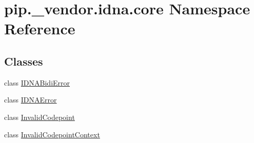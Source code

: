 \hypertarget{namespacepip_1_1__vendor_1_1idna_1_1core}{}\section{pip.\+\_\+vendor.\+idna.\+core Namespace Reference}
\label{namespacepip_1_1__vendor_1_1idna_1_1core}
\subsection*{Classes}
\begin{DoxyCompactItemize}
\item 
class \hyperlink{classpip_1_1__vendor_1_1idna_1_1core_1_1IDNABidiError}{I\+D\+N\+A\+Bidi\+Error}
\item 
class \hyperlink{classpip_1_1__vendor_1_1idna_1_1core_1_1IDNAError}{I\+D\+N\+A\+Error}
\item 
class \hyperlink{classpip_1_1__vendor_1_1idna_1_1core_1_1InvalidCodepoint}{Invalid\+Codepoint}
\item 
class \hyperlink{classpip_1_1__vendor_1_1idna_1_1core_1_1InvalidCodepointContext}{Invalid\+Codepoint\+Context}
\end{DoxyCompactItemize}
